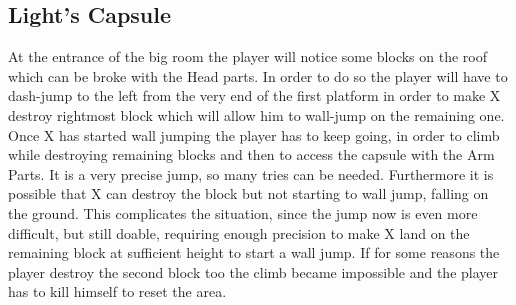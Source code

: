 \subsection{Light's Capsule}
At the entrance of the big room the player will notice some blocks on the roof which can be broke with the Head parts. In order to do so the player will have to dash-jump to the left from the very end of the first platform in order to make X destroy rightmost block which will allow him to wall-jump on the remaining one. Once X has started wall jumping the player has to keep going, in order to climb while destroying remaining blocks and then to access the capsule with the Arm Parts. It is a very precise jump, so many tries can be needed. Furthermore it is possible that X can destroy the block but not starting to wall jump, falling on the ground. This complicates the situation, since the jump now is even more difficult, but still doable, requiring enough precision to make X land on the remaining block at sufficient height to start a wall jump. If for some reasons the player destroy the second block too the climb became impossible and the player has to kill himself to reset the area.
